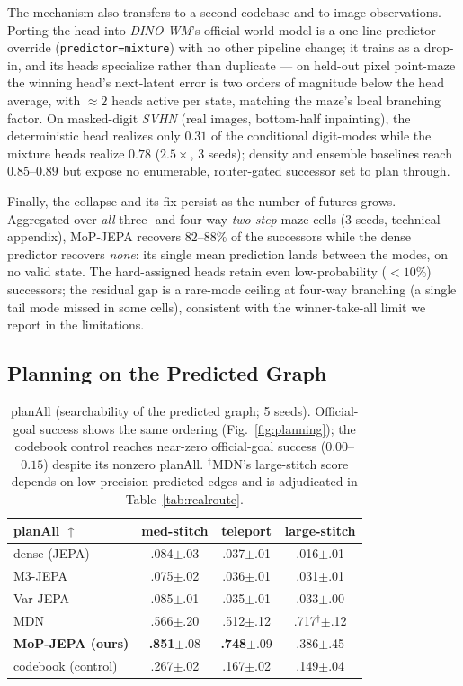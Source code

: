 \documentclass[letterpaper]{article}
\begin{document}
The mechanism also transfers to a second codebase and to image observations. Porting the head into
\emph{DINO-WM}'s official world model \citep{zhou2024dinowm} is a one-line predictor override
(\texttt{predictor=mixture}) with no other pipeline change; it trains as a drop-in, and its heads
specialize rather than duplicate --- on held-out pixel point-maze the winning head's next-latent error is
two orders of magnitude below the head average, with $\approx\!2$ heads active per state, matching the
maze's local branching factor. On masked-digit \emph{SVHN} (real images, bottom-half inpainting), the
deterministic head realizes only $0.31$ of the conditional digit-modes while the mixture heads realize
$0.78$ ($2.5\times$, 3 seeds); density and ensemble baselines reach $0.85$--$0.89$ but expose no
enumerable, router-gated successor set to plan through.

Finally, the collapse and its fix persist as the number of futures grows. Aggregated over \emph{all}
three- and four-way \emph{two-step} maze cells ($3$ seeds, technical appendix), MoP-JEPA recovers
$82$--$88\%$ of the successors while the dense predictor recovers \emph{none}: its single mean prediction
lands between the modes, on no valid state. The hard-assigned heads retain even low-probability ($<\!10\%$)
successors; the residual gap is a rare-mode ceiling at four-way branching (a single tail mode missed in
some cells), consistent with the winner-take-all limit we report in the limitations.

\subsection{Planning on the Predicted Graph}

\begin{table}[t]
\centering
\small
\begin{tabular}{@{}lccc@{}}
\toprule
planAll $\uparrow$ & med-stitch & teleport & large-stitch \\
\midrule
dense (JEPA) & .084{\tiny$\pm$.03} & .037{\tiny$\pm$.01} & .016{\tiny$\pm$.01} \\
M3-JEPA & .075{\tiny$\pm$.02} & .036{\tiny$\pm$.01} & .031{\tiny$\pm$.01} \\
Var-JEPA & .085{\tiny$\pm$.01} & .035{\tiny$\pm$.01} & .033{\tiny$\pm$.00} \\
MDN & .566{\tiny$\pm$.20} & .512{\tiny$\pm$.12} & .717$^{\dagger}${\tiny$\pm$.12} \\
\textbf{MoP-JEPA (ours)} & \textbf{.851}{\tiny$\pm$.08} & \textbf{.748}{\tiny$\pm$.09} & .386{\tiny$\pm$.45} \\
\midrule
codebook (control) & .267{\tiny$\pm$.02} & .167{\tiny$\pm$.02} & .149{\tiny$\pm$.04} \\
\bottomrule
\end{tabular}
\caption{planAll (searchability of the predicted graph; 5 seeds). Official-goal success shows the same
ordering (Fig.~\ref{fig:planning}); the codebook control reaches near-zero official-goal success
($0.00$--$0.15$) despite its nonzero planAll. $^{\dagger}$MDN's large-stitch score depends on
low-precision predicted edges and is adjudicated in Table~\ref{tab:realroute}.}
\label{tab:planning}
\end{table}
\end{document}
